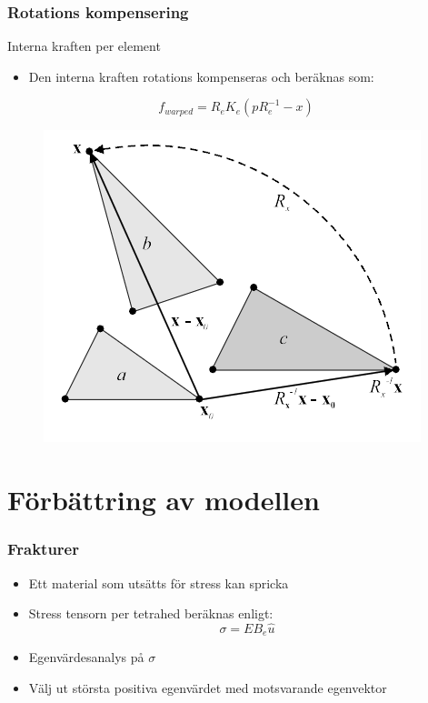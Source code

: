 \documentclass{beamer}
\begin{document}
\begin{frame}
\frametitle{Rotations kompensering}
\begin{block}{Interna kraften per element}
\begin{itemize}
\item Den interna kraften rotations kompenseras och beräknas som: 
\end{itemize}
\begin{equation}\label{eqn:stiffnessmatrix}
    f_{warped} = R_{e}K_{e}(pR_{e}^{-1}-x)
\end{equation}
\begin{figure}
\includegraphics[scale=0.5]{warpedstiffness.png}
\end{figure}
\end{block}
\end{frame}

\section{Förbättring av modellen}
\begin{frame}
\frametitle{Frakturer}
\begin{itemize}
\item Ett material som utsätts för stress kan spricka 

\item Stress tensorn per tetrahed beräknas enligt:
\begin{equation}\label{eqn:stiffnessmatrix}
    \sigma = EB_{e}\hat{u}
\end{equation}

\item Egenvärdesanalys på $\sigma$

\item Välj ut största positiva egenvärdet med motsvarande egenvektor

\end{itemize}
\end{frame}
\end{document}
